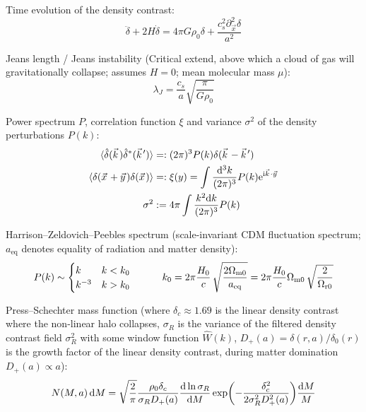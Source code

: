 		\noindent
		Time evolution of the density contrast:
		\begin{equation}
			\ddot{\delta} + 2 H \dot{\delta} = 4 \pi G \rho_0 \delta + \frac{c_s^2 \partial_{\vec{x}}^2 \delta}{a^2}
		\end{equation}

		\noindent
		Jeans length / Jeans instability (Critical extend, above which a cloud of gas will gravitationally collapse; assumes $H=0$; mean molecular mass $\mu$):
		\begin{equation}
			\lambda_J = \frac{c_s}{a} \sqrt{\frac{\pi}{G \rho_0}}
		\end{equation}

		\noindent
		Power spectrum $P$, correlation function $\xi$ and variance $\sigma^2$ of the density perturbations $P(k)$:
		\begin{align}
			\avg{\hat{\delta}(\vec{k}) \hat{\delta}^{*}(\vec{k}')} &=: (2\pi)^3 P(k) \delta (\vec{k}-\vec{k}') \\
			\avg{\delta(\vec{x} + \vec{y}) \delta(\vec{x})} &=: \xi(y) = \int \frac{\dd^3 k}{(2\pi)^3} P(k) \ex^{\i \vec{k} \cdot \vec{y}}\\
			\sigma^2 &:= 4\pi\int \frac{k^2 \dd k}{(2 \pi)^3} P(k)
		\end{align}

		\noindent
		Harrison--Zeldovich--Peebles spectrum (scale-invariant CDM fluctuation spectrum; $a_{\text{eq}}$ denotes equality of radiation and matter density):
		\begin{equation}
			P(k) \sim
			\begin{cases}
				k & k < k_0\\
				k^{-3} & k > k_0
			\end{cases}
			\hspace{30pt}
			k_0 = 2\pi{\frac{H_{0}}{c}}\,{\sqrt{\frac{2\Omega_{\mathrm{m0}}}{a_{\mathrm{eq}}}}}=2\pi{\frac{H_{0}}{c}}\Omega_{\mathrm{m0}}\,{\sqrt{\frac{2}{\Omega_{\mathrm{r0}}}}}
		\end{equation}

		\noindent
		Press--Schechter mass function (where $\delta_c \approx 1.69$ is the linear density contrast where the non-linear halo collapses, $\sigma_R$ is the variance of the filtered density contrast field $\sigma_R^2$ with some window function $\hat{W}(k)$, $D_+(a) = \delta(r,a)/\delta_0(r)$ is the growth factor of the linear density contrast, during matter domination $D_+(a) \propto a$):
		\begin{equation}
			N(M,a) \,\dd M = \sqrt{\frac{2}{\pi}} \frac{\rho_0 \delta_c}{\sigma_R D_{+}(a)} \dv{\ln\sigma_R}{M} \exp(-\frac{\delta_c^2}{2 \sigma_R^2 D_{+}^2(a)}) \frac{\dd M}{M}
		\end{equation}

